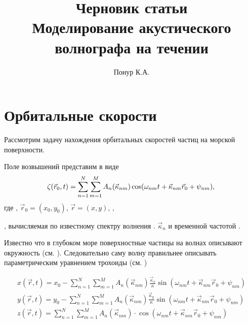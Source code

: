 



\newcommand\fullsum{\sum\limits_{n=1}^{N} \sum\limits_{m=1}^{M}}
\newcommand\fullphase{\omega_{nm}t + \vec \kappa_{nm}\vec r_0 + \psi_{nm}}

\title{Черновик статьи \\ \textbf{Моделирование акустического волнографа на
течении}}
\author{Понур К.А.}


\maketitle

\section*{Орбитальные скорости}%
\label{sec:orbital_nye_skorosti}

Рассмотрим задачу нахождения орбитальных скоростей частиц на морской
поверхности.

Поле возвышений  представим в виде
\begin{equation}
    \label{eq:surface3d_default}
    \zeta(\vec r_0,t) = \fullsum A_n(\vec \kappa_{nm}) \cos(\fullphase),    \\
\end{equation}
где ,  
$\vec r_0 = (x_0, y_0)$, $\vec r = (x, y)$, 
, 

, вычисляемая по известному спектру волнения \cite{ryabkova}.
$\vec \kappa_n$ и временной частотой
 \cite{pustovoytenko}.



Известно что в глубоком море
поверхностные частицы на волнах описывают окружность (см. \cite{shuleykin}).
Следовательно саму волну правильнее описывать параметрическим уравнением
трохоиды (см. \cite{nouguier})

\begin{equation}
    \begin{gathered}
        \label{eq:surface3d_cwm}
        x(\vec r,t) = x_0 - \fullsum A_n(\vec \kappa_{nm})\frac{\vec \kappa_x}{\kappa}        \sin(\fullphase)\\
        y(\vec r,t) = y_0 - \fullsum A_n(\vec \kappa_{nm}) \frac{\vec \kappa_y}{\kappa}
        \sin(\fullphase)\\
        z(\vec r,t) = \fullsum
        A_n(\vec \kappa_{nm}) \cdot \cos(\fullphase)    \\
    \end{gathered}
\end{equation}

